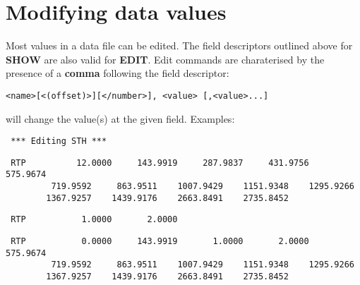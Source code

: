 \section{ Modifying data values } 
\label{.edit} 

	Most values in a data file can be edited.  The field descriptors
outlined above for {\bf SHOW} are also valid for {\bf EDIT}.  Edit commands are
charaterised by the presence of a {\bf comma} following the field descriptor: 

\indent \verb:<name>[<(offset)>][</number>], <value> [,<value>...]: 

\noindent will change the value(s) at the given field. Examples: 

%
\spbegin %
\svbegin \begin{verbatim} 
 *** Editing STH *** 
\end{verbatim} 
%
%
\svbegin \begin{verbatim} 
 RTP          12.0000     143.9919     287.9837     431.9756     575.9674
	     719.9592     863.9511    1007.9429    1151.9348    1295.9266
	    1367.9257    1439.9176    2663.8491    2735.8452
\end{verbatim} 
\svend 
\spend %
%
\spbegin %
%
\svbegin \begin{verbatim} 
 RTP           1.0000       2.0000
\end{verbatim} 
\svend 
\spend %
%
\spbegin %
%
\svbegin \begin{verbatim} 
 RTP           0.0000     143.9919       1.0000       2.0000     575.9674
	     719.9592     863.9511    1007.9429    1151.9348    1295.9266
	    1367.9257    1439.9176    2663.8491    2735.8452
\end{verbatim} 
\svend 
\spend %
%
\spbegin %
